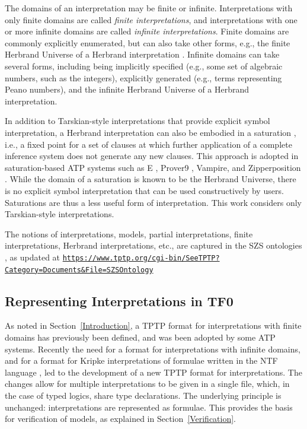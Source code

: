 \documentclass{easychair}
\newcommand{\smalltt}[1]{\small \texttt{#1}}
\begin{document}
The domains of an interpretation may be finite or infinite.
Interpretations with only finite domains are called {\em finite interpretations}, and
interpretations with one or more infinite domains are called {\em infinite interpretations}.
Finite domains are commonly explicitly enumerated, but can also take other forms, e.g., the 
finite Herbrand Universe of a Herbrand interpretation \cite{Her30}.
Infinite domains can take several forms, including being implicitly specified (e.g., some set
of algebraic numbers, such as the integers), explicitly generated (e.g., terms representing 
Peano numbers), and the infinite Herbrand Universe of a Herbrand interpretation.

In addition to Tarskian-style interpretations that provide explicit symbol interpretation, 
a Herbrand interpretation can also be embodied in a saturation \cite{BG+01},
i.e., a fixed point for a set of clauses at which further application of a complete inference 
system does not generate any new clauses.
This approach is adopted in saturation-based ATP systems such as E \cite{SCV19},
Prover9 \cite{McC-Prover9-URL}, Vampire, and Zipperposition \cite{VB+21}.
While the domain of a saturation is known to be the Herbrand Universe, there is no explicit
symbol interpretation that can be used constructively by users.
Saturations are thus a less useful form of interpretation.
This work considers only Tarskian-style interpretations.

The notions of interpretations, models, partial interpretations, finite interpretations,
Herbrand interpretations, etc., are captured in the SZS ontologies \cite{Sut08-KEAPPA}, as
updated at 
{\smalltt{\url{https://www.tptp.org/cgi-bin/SeeTPTP?Category=Documents&File=SZSOntology}}}

\subsection{Representing Interpretations in TF0}
\label{InterpretationsTF0}

As noted in Section~\ref{Introduction}, a TPTP format for interpretations with finite domains 
has previously been defined, and was been adopted by some ATP systems.
Recently the need for a format for interpretations with infinite domains, and for a format for 
Kripke interpretations \cite{Kri63} of formulae written in the NTF language \cite{SF+22}, 
led to the development of a new TPTP format for interpretations.
The changes allow for multiple interpretations to be given in a single file, which, in the case 
of typed logics, share type declarations.
The underlying principle is unchanged: interpretations are represented as formulae.
This provides the basis for verification of models, as explained in Section~\ref{Verification}.
\end{document}
